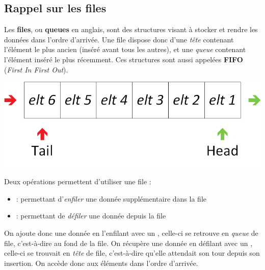 \bigskip


\subsection{Rappel sur les files}

\bigskip

Les \textbf{files}, ou \textbf{queues} en anglais, sont des structures visant à stocker et rendre les données dans l'ordre d'arrivée.
Une file dispose donc d'une \textit{tête} contenant l'élément le plus ancien (inséré avant tous les autres), et une \textit{queue} contenant l'élément inséré le plus récemment.
Ces structures sont aussi appelées \textbf{FIFO} (\textit{First In First Out}).\\

\begin{center}
\includegraphics[scale=0.75]{Cours/Files_1_Structure_Generale.png}
\end{center}

\smallskip

Deux opérations permettent d'utiliser une file :
\begin{itemize}
\item {} : permettant d'\textit{enfiler} une donnée supplémentaire dans la file
\item {} : permettant de \textit{défiler} une donnée depuis la file
\end{itemize}
On ajoute donc une donnée en l'enfilant avec un , celle-ci se retrouve en \textit{queue} de file, c'est-à-dire au fond de la file.
On récupère une donnée en défilant avec un , celle-ci se trouvait en \textit{tête} de file, c'est-à-dire qu'elle attendait son tour depuis son insertion.
On accède donc aux éléments dans l'ordre d'arrivée.\\

